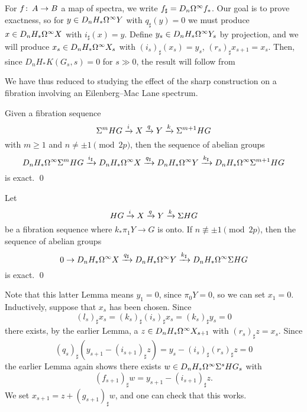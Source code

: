 For $f\colon\thinspace A \to B$ a map of spectra, we write $f_\sharp = D_n \Omega^\infty f_*$.  Our goal is to prove exactness, so for $y \in D_n H_* \Omega^\infty Y$ with $q_\sharp(y) = 0$ we must produce $x \in D_n H_* \Omega^\infty X$ with $i_\sharp(x) = y$.  Define $y_s \in D_n H_* \Omega^\infty Y_s$ by projection, and we will produce $x_s \in D_n H_* \Omega^\infty X_s$ with $(i_s)_\sharp(x_s) = y_s$, $(r_s)_\sharp x_{s+1} = x_s$.  Then, since $D_n H_* K(G_s, s) = 0$ for $s \gg 0$, the result will follow from
\begin{center}
\end{center}
We have thus reduced to studying the effect of the sharp construction on a fibration involving an Eilenberg--Mac Lane spectrum.

\begin{lemma}
Given a fibration sequence \[\Sigma^m HG \xrightarrow i X \xrightarrow q Y \xrightarrow k \Sigma^{m+1} HG\] with $m \ge 1$ and $n \ne \pm 1 \pmod{2p}$, then the sequence of abelian groups \[D_n H_* \Omega^\infty \Sigma^m HG \xrightarrow{i_\sharp} D_n H_* \Omega^\infty X \xrightarrow{q_\sharp} D_n H_* \Omega^\infty Y \xrightarrow{k_\sharp} D_n H_* \Omega^\infty \Sigma^{m+1} HG\] is exact. \qed
\end{lemma}

\begin{lemma}
Let \[HG \xrightarrow i X \xrightarrow q Y \xrightarrow k \Sigma HG\] be a fibration sequence where $k_* \pi_1 Y \to G$ is onto.  If $n \not\equiv \pm 1 \pmod{2p}$, then the sequence of abelian groups \[0 \to D_n H_* \Omega^\infty X \xrightarrow{q_\sharp} D_n H_* \Omega^\infty Y \xrightarrow{k_\sharp} D_n H_* \Omega^\infty \Sigma HG\] is exact. \qed
\end{lemma}

Note that this latter Lemma means $y_1 = 0$, since $\pi_0 Y = 0$, so we can set $x_1 = 0$.  Inductively, suppose that $x_s$ has been chosen.  Since \[(l_s)_\sharp x_s = (k_s)_\sharp (i_s)_\sharp x_s = (k_s)_\sharp y_s = 0\] there exists, by the earlier Lemma, a $z \in D_n H_* \Omega^\infty X_{s+1}$ with $(r_s)_\sharp z = x_s$.  Since \[(q_s)_\sharp(y_{s+1} - (i_{s+1})_\sharp z) = y_s - (i_s)_\sharp (r_s)_\sharp z = 0\] the earlier Lemma again shows there exists $w \in D_n H_* \Omega^\infty \Sigma^s HG_s$ with \[(f_{s+1})_\sharp w = y_{s+1} - (i_{s+1})_\sharp z.\]  We set $x_{s+1} = z + (g_{s+1})_\sharp w$, and one can check that this works.




